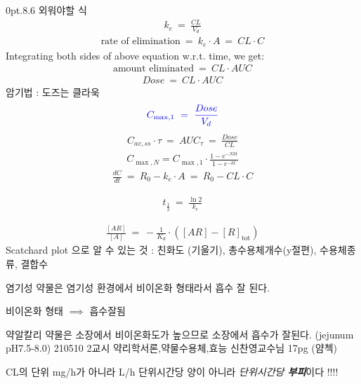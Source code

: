 \documentclass[10pt]{amsart}
\makeatletter
\numberwithin{theorem}{section}
\numberwithin{example}{section}
\newcommand{\lf}{\left}
\newcommand{\rg}{\right}
\theoremstyle{definition}
\theoremstyle{remark}
\newcommand{\blue}[1]{\textcolor{blue}{#1}}
\renewcommand\section{\@startsection{section}{1}%
{0pt}{.8\linespacing\@plus\linespacing}{.6\linespacing}%
{\LARGE\bfseries\color{black}}}
\makeatother
\begin{document}
\section{외워야할 식}
\begin{align*}
    k_e \ = \ \frac{CL}{V_d}
\end{align*}
\begin{align*}
\text{rate of elimination} \ = \ k_e\cdot A \ = \ CL\cdot C    
\end{align*}
Integrating both sides of above equation w.r.t. time, we get:
\begin{align*}
\text{amount eliminated} \ = \ CL \cdot AUC    
\end{align*}
\begin{align*}
Dose \ = \ CL \cdot AUC    
\end{align*}
암기법 : 도즈는 클라욱
\begin{align*}
\blue{C_{\max,1} \ = \ \frac{Dose}{V_d}}    
\end{align*}
\begin{align*}
C_{av, ss} \cdot \tau \ = \ AUC_\tau    \ = \ \frac{Dose}{CL}
\end{align*}
\begin{align*}
C_{\max,N} = C_{\max,1}\cdot \frac{1-e^{-Nkt}}{1-e^{-kt} }    
\end{align*}
\begin{align*}
\frac{dC}{dt} \ = \ R_0 - k_e\cdot A \ = \ R_0 - CL\cdot C    
\end{align*}

\begin{align*}
    t_\frac{1}{2} \ = \ \frac{\ln2}{k_e}
\end{align*}


\begin{align*}
\frac{[AR]}{[A]}
\ = \ -\frac{1}{K_d}\cdot \lf([AR]- [R]_\text{tot}\rg) 
\end{align*}
Scatchard plot 으로 알 수 있는 것 : 친화도 (기울기), 총수용체개수(y절편), 수용체종류, 결합수  



염기성 약물은 염기성 환경에서 비이온화 형태라서 흡수 잘 된다. 

비이온화 형태 $\implies$ 흡수잘됨 

약알칼리 약물은 소장에서 비이온화도가 높으므로 소장에서 흡수가 잘된다. (jejunum pH7.5-8.0) 210510 2교시 약리학서론,약물수용체,효능 신찬영교수님 17pg (얌첵) 


CL의 단위 \si{mg/h}가 아니라 \si{L/h}  단위시간당 양이 아니라 \textit{단위시간당 \textbf{부피}}이다 !!!!
\end{document}
